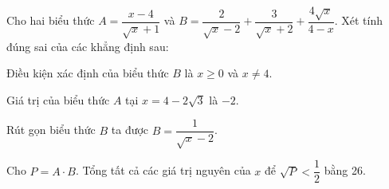 
\begin{bt}
Cho hai biểu thức $A = \dfrac{x - 4}{\sqrt{x} + 1}$ và $B = \dfrac{2}{\sqrt{x} - 2} + \dfrac{3}{\sqrt{x} + 2} + \dfrac{4\sqrt{x}}{4 - x}$. Xét tính đúng sai của các khẳng định sau:
\begin{cacy}
\item Điều kiện xác định của biểu thức $B$ là $x \ge 0$ và $x \ne 4$.
\item Giá trị của biểu thức $A$ tại $x = 4 - 2\sqrt{3}$ là $-2$.
\item Rút gọn biểu thức $B$ ta được $B = \dfrac{1}{\sqrt{x} - 2}$.
\item Cho $P = A \cdot B$. Tổng tất cả các giá trị nguyên của $x$ để $\sqrt{P} < \dfrac{1}{2}$ bằng 26.
\end{cacy}
\end{bt}

